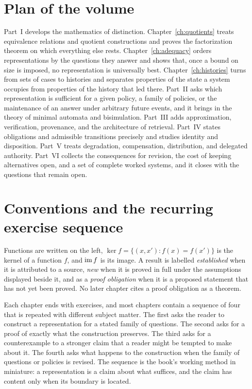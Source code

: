 \section{Plan of the volume}

Part~I develops the mathematics of distinction. Chapter~\ref{ch:quotients} treats equivalence relations and quotient constructions and proves the factorization theorem on which everything else rests. Chapter~\ref{ch:adequacy} orders representations by the questions they answer and shows that, once a bound on size is imposed, no representation is universally best. Chapter~\ref{ch:histories} turns from sets of cases to histories and separates properties of the state a system occupies from properties of the history that led there. Part~II asks which representation is sufficient for a given policy, a family of policies, or the maintenance of an answer under arbitrary future events, and it brings in the theory of minimal automata and bisimulation. Part~III adds approximation, verification, provenance, and the architecture of retrieval. Part~IV states obligations and admissible transitions precisely and studies identity and disposition. Part~V treats degradation, compensation, distribution, and delegated authority. Part~VI collects the consequences for revision, the cost of keeping alternatives open, and a set of complete worked systems, and it closes with the questions that remain open.

\section{Conventions and the recurring exercise sequence}

Functions are written on the left, $\ker f=\{(x,x') : f(x)=f(x')\}$ is the kernel of a function $f$, and $\operatorname{im} f$ is its image. A result is labelled \emph{established} when it is attributed to a source, \emph{new} when it is proved in full under the assumptions displayed beside it, and as a \emph{proof obligation} when it is a proposed statement that has not yet been proved. No later chapter cites a proof obligation as a theorem.

Each chapter ends with exercises, and most chapters contain a sequence of four that is repeated with different subject matter. The first asks the reader to construct a representation for a stated family of questions. The second asks for a proof of exactly what the construction preserves. The third asks for a counterexample to a stronger claim that a reader might be tempted to make about it. The fourth asks what happens to the construction when the family of questions or policies is revised. The sequence is the book's working method in miniature: a representation is a claim about what suffices, and the claim has content only when its boundary is located.


